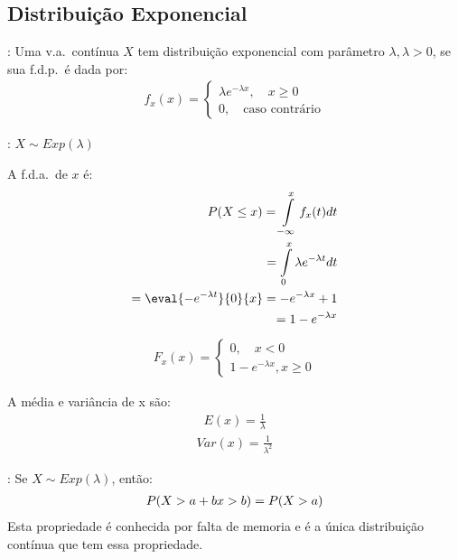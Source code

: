 \subsection{Distribuição Exponencial}
\begin{description}
  \item [Definição]: Uma v.a.\ contínua $X$ tem distribuição exponencial com parâmetro $\lambda, \lambda>0$, se sua
    f.d.p.\ é dada por:
    \begin{align*}
      f_{x} (x)= \begin{cases}
        \lambda e^{- \lambda x} , \quad x \ge 0 \\
        0, \quad \text{caso contrário}
      \end{cases}
    \end{align*}
  \item[Notação]: $X \mathtt{\sim} Exp(\lambda)$
    \begin{figure}[H]
      \centering
      
    \end{figure}
    \item A f.d.a.\ de $x$ é:
      \begin{align*}
        P(X \le x)  = \int \limits_{ -\infty }^{x} f_{x}(t)dt \\
        = \int \limits_{0}^{x} \lambda e^{-\lambda t } dt \\
        = \eval{-e^{-\lambda t}}{0}{x} = -e^{-\lambda x} +1\\
        = 1- e^{-\lambda x}
      \end{align*}
      \begin{align*}
        F_{x} (x) = \begin{cases}
         0, \quad x<0\\
         1-e^{-\lambda x} , x\ge 0
        \end{cases}
      \end{align*}
    \item A média e variância de x são:
      \begin{align*}
        E(x) = \frac{1}{\lambda}
      \end{align*}
      \begin{align*}
        Var(x) = \frac{1}{\lambda^2}
      \end{align*}
    \item[Propriedade]:
       Se $X \mathtt{\sim}  Exp(\lambda)$, então:
        \begin{align*}
          P(X> a+b  \/ x>b) = P(X > a)
        \end{align*}
        Esta propriedade é conhecida por falta de memoria e é a única distribuição 
        contínua que tem essa propriedade.


\end{description}
